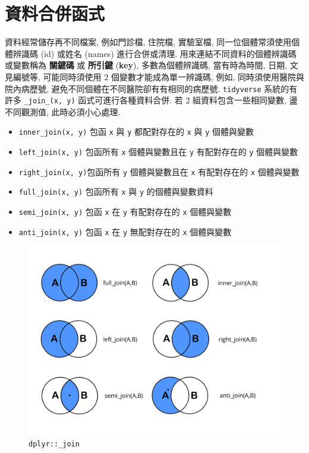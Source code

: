 \documentclass[
]{book}
\providecommand{\tightlist}{%
  \setlength{\itemsep}{0pt}\setlength{\parskip}{0pt}}
\begin{document}
\hypertarget{ux8cc7ux6599ux5408ux4f75ux51fdux5f0f}{%
\section{資料合併函式}\label{ux8cc7ux6599ux5408ux4f75ux51fdux5f0f}}

資料經常儲存再不同檔案,
例如門診檔, 住院檔, 實驗室檔,
同一位個體常須使用個體辨識碼 (id) 或姓名 (names)
進行合併或清理.
用來連結不同資料的個體辨識碼或變數稱為
\textbf{關鍵碼} 或 \textbf{所引鍵}
(\textbf{key}),
多數為個體辨識碼, 當有時為時間, 日期, 文見編號等,
可能同時須使用 2 個變數才能成為單一辨識碼,
例如, 同時須使用醫院與院內病歷號,
避免不同個體在不同醫院卻有有相同的病歷號.
\texttt{tidyverse} 系統的有許多 \texttt{\_join\_(x,\ y)} 函式可進行各種資料合併.
若 2 組資料包含一些相同變數, 盪不同觀測值, 此時必須小心處理.

\begin{itemize}
\tightlist
\item
  \texttt{inner\_join(x,\ y)} 包函 \texttt{x} 與 \texttt{y} 都配對存在的 \texttt{x} 與 \texttt{y} 個體與變數
\item
  \texttt{left\_join(x,\ y)} 包函所有 \texttt{x} 個體與變數且在 \texttt{y} 有配對存在的 \texttt{y} 個體與變數
\item
  \texttt{right\_join(x,\ y)}包函所有 \texttt{y} 個體與變數且在 \texttt{x} 有配對存在的 \texttt{x} 個體與變數
\item
  \texttt{full\_join(x,\ y)} 包函所有 \texttt{x} 與 \texttt{y} 的個體與變數資料
\item
  \texttt{semi\_join(x,\ y)} 包函 \texttt{x} 在 \texttt{y} 有配對存在的 \texttt{x} 個體與變數
\item
  \texttt{anti\_join(x,\ y)} 包函 \texttt{x} 在 \texttt{y} 無配對存在的 \texttt{x} 個體與變數
\end{itemize}

\begin{figure}
\centering
\includegraphics{./images/tidyversrejoin.png}
\caption{\texttt{dplyr::\_join}}
\end{figure}
\end{document}
